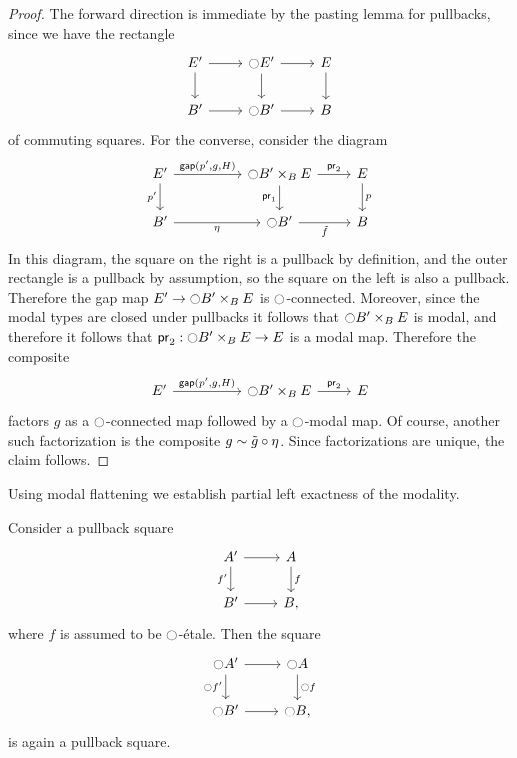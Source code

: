 \documentclass[9pt,twosided]{amsart}
\begin{document}
\begin{proof}
  The forward direction is immediate by the pasting lemma for pullbacks, since we have the rectangle
  \begin{equation*}
    \begin{tikzcd}
      E' \arrow[r] \arrow[d] & \modal E' \arrow[r] \arrow[d] & E \arrow[d] \\
      B' \arrow[r] & \modal B' \arrow[r] & B
    \end{tikzcd}
  \end{equation*}
  of commuting squares.
For the converse, consider the diagram
\begin{equation*}
\begin{tikzcd}
E' \arrow[r,"{\mathsf{gap}(p',g,H)}"] \arrow[d,swap,"{p'}"] &[2.5em] \modal B'\times_{B} E \arrow[r,"\proj 2"] \arrow[d,swap,"\proj 1"] & E \arrow[d,"p"] \\
B' \arrow[r,swap,"\modalunit"] & \modal B' \arrow[r,swap,"\tilde{f}"] & B
\end{tikzcd}
\end{equation*}
In this diagram, the square on the right is a pullback by definition, and the outer rectangle is a pullback by assumption, so the square on the left is also a pullback. Therefore the gap map $E'\to {\ensuremath{\ocircle}} B'\times_B E$ is ${\ocircle}$-connected. Moreover, since the modal types are closed under pullbacks it follows that ${\ocircle} B'\times_B E$ is modal, and therefore it follows that $\mathsf{pr}_{2}:{\ocircle} B'\times_B E\to E$ is a modal map. Therefore the composite
\begin{equation*}
\begin{tikzcd}
E' \arrow[r,"{\mathsf{gap}(p',g,H)}"] &[2.5em] \modal B'\times_{B} E \arrow[r,"\proj 2"] & E 
\end{tikzcd}
\end{equation*}
factors $g$ as a ${\ocircle}$-connected map followed by a ${\ocircle}$-modal map. Of course, another such factorization is the composite $g\sim \tilde{g}\circ{\eta_{}}$. Since factorizations are unique, the claim follows.
\end{proof}

Using modal flattening we establish partial left exactness of the modality.

\begin{cor}\label{cor:etale_lex}
Consider a pullback square
\begin{equation*}
\begin{tikzcd}
A' \arrow[d,swap,"{f'}"] \arrow[r] & A \arrow[d,"f"] \\
B' \arrow[r] & B,
\end{tikzcd}
\end{equation*}
where $f$ is assumed to be ${\ocircle}$-\'etale. Then the square
\begin{equation*}
\begin{tikzcd}
\modal A' \arrow[d,swap,"{\modal f'}"] \arrow[r] & \modal A \arrow[d,"\modal f"] \\
\modal B' \arrow[r] & \modal B,
\end{tikzcd}
\end{equation*}
is again a pullback square.
\end{cor}
\end{document}

